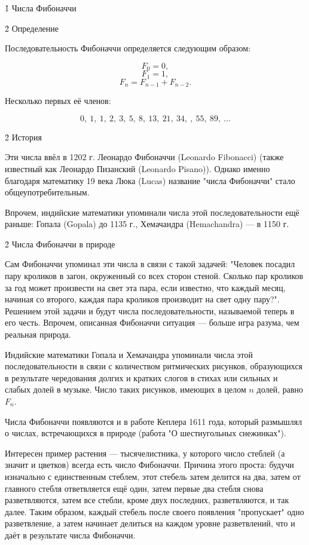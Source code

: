 \h1{ Числа Фибоначчи }


\h2{ Определение }

Последовательность Фибоначчи определяется следующим образом:

$$ F_0 = 0, $$
$$ F_1 = 1, $$
$$ F_n = F_{n-1} + F_{n-2}. $$

Несколько первых её членов:

$$ 0, ~ 1, ~ 1, ~ 2, ~ 3, ~ 5, ~ 8, ~ 13, ~ 21, ~ 34, ~ , ~ 55, ~ 89, ~ \ldots $$


\h2{ История }

Эти числа ввёл в 1202 г. Леонардо Фибоначчи (Leonardo Fibonacci) (также известный как Леонардо Пизанский (Leonardo Pisano)). Однако именно благодаря математику 19 века Люка (Lucas) название "числа Фибоначчи" стало общеупотребительным.

Впрочем, индийские математики упоминали числа этой последовательности ещё раньше: Гопала (Gopala) до 1135 г., Хемачандра (Hemachandra) --- в 1150 г.


\h2{ Числа Фибоначчи в природе }

Сам Фибоначчи упоминал эти числа в связи с такой задачей: "Человек посадил пару кроликов в загон, окруженный со всех сторон стеной. Сколько пар кроликов за год может произвести на свет эта пара, если известно, что каждый месяц, начиная со второго, каждая пара кроликов производит на свет одну пару?". Решением этой задачи и будут числа последовательности, называемой теперь в его честь. Впрочем, описанная Фибоначчи ситуация --- больше игра разума, чем реальная природа.

Индийские математики Гопала и Хемачандра упоминали числа этой последовательности в связи с количеством ритмических рисунков, образующихся в результате чередования долгих и кратких слогов в стихах или сильных и слабых долей в музыке. Число таких рисунков, имеющих в целом $n$ долей, равно $F_n$.

Числа Фибоначчи появляются и в работе Кеплера 1611 года, который размышлял о числах, встречающихся в природе (работа "О шестиугольных снежинках").

Интересен пример растения --- тысячелистника, у которого число стеблей (а значит и цветков) всегда есть число Фибоначчи. Причина этого проста: будучи изначально с единственным стеблем, этот стебель затем делится на два, затем от главного стебля ответвляется ещё один, затем первые два стебля снова разветвляются, затем все стебли, кроме двух последних, разветвляются, и так далее. Таким образом, каждый стебель после своего появления "пропускает" одно разветвление, а затем начинает делиться на каждом уровне разветвлений, что и даёт в результате числа Фибоначчи.

